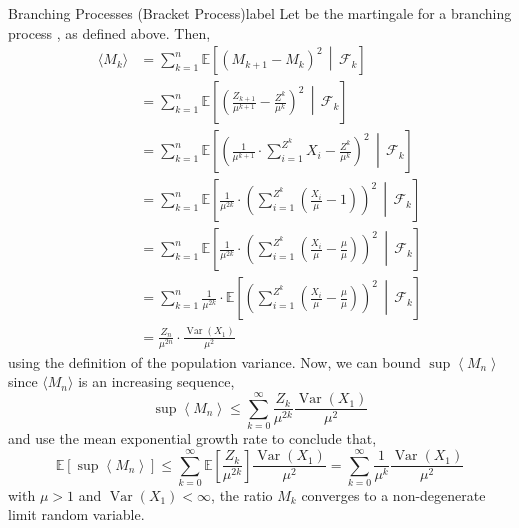 \documentclass{tufte-handout}
\begin{document}
\begin{ex}{Branching Processes (Bracket Process)}{label}
  Let  be the martingale for a branching process , as defined above. Then,
  \begin{align*}
     \langle M_k \rangle
     &= \sum_{k=1}^n \mathbb{E}\left[(M_{k+1} - M_k)^2 \,\middle\vert\, \mathcal{F}_k \right] \\
     &= \sum_{k=1}^n \mathbb{E}\left[\left(\frac{Z_{k+1}}{\mu^{k+1}}-\frac{Z^k}{\mu^k}\right)^2 \,\middle\vert\, \mathcal{F}_k \right] \\
     &= \sum_{k=1}^n \mathbb{E}\left[\left(\frac{1}{\mu^{k+1}} \cdot \sum_{i=1}^{Z^k} X_i -\frac{Z^k}{\mu^k}\right)^2 \,\middle\vert\, \mathcal{F}_k \right] \\
     &= \sum_{k=1}^n \mathbb{E}\left[\frac{1}{\mu^{2k}} \cdot \left(\sum_{i=1}^{Z^k} \left(\frac{X_i}{\mu} -1\right) \right)^2 \,\middle\vert\, \mathcal{F}_k \right] \\
     &= \sum_{k=1}^n \mathbb{E}\left[\frac{1}{\mu^{2k}} \cdot \left(\sum_{i=1}^{Z^k} \left(\frac{X_i}{\mu} - \frac{\mu}{\mu}\right) \right)^2 \,\middle\vert\, \mathcal{F}_k \right] \\
     &= \sum_{k=1}^n \frac{1}{\mu^{2k}} \cdot \mathbb{E}\left[\left(\sum_{i=1}^{Z^k} \left(\frac{X_i}{\mu} - \frac{\mu}{\mu}\right) \right)^2 \,\middle\vert\, \mathcal{F}_k \right] \\
     &= \frac{Z_{n}}{\mu^{2 n}} \cdot \frac{\operatorname{Var}\left(X_{1}\right)}{\mu^{2}}
   \end{align*} 
  \noindent using the definition of the population variance. Now, we can bound $\sup \left\langle M_{n}\right\rangle$ since $\langle M_n \rangle$ is an increasing sequence,
  \[\sup \left\langle M_{n}\right\rangle \leq \sum_{k=0}^{\infty} \frac{Z_{k}}{\mu^{2 k}} \frac{\operatorname{Var}\left(X_{1}\right)}{\mu^{2}}\]
  \noindent and use the mean exponential growth rate to conclude that,
  \[\mathbb{E}\left[\sup \left\langle M_{n}\right\rangle\right] \leq \sum_{k=0}^{\infty} \mathbb{E}\left[\frac{Z_{k}}{\mu^{2 k}}\right] \frac{\operatorname{Var}\left(X_{1}\right)}{\mu^{2}} =\sum_{k=0}^{\infty} \frac{1}{\mu^{k}} \frac{\operatorname{Var}\left(X_{1}\right)}{\mu^{2}}\]
  \noindent with $\mu > 1$ and $\operatorname{Var}\left(X_{1}\right) < \infty$, the ratio $M_k$ converges to a non-degenerate limit random variable. 
\end{ex}
\end{document}
